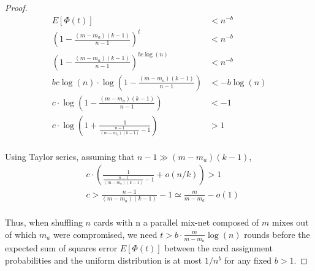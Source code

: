 \documentclass[USenglish,oneside,twocolumn]{article}
\begin{document}
\begin{proof}
\begin{align*}
E[\Phi(t)]&< n^{-b}\\
(1-\frac{(m-m_a)(k-1)}{n-1})^t&< n^{-b}\\
(1-\frac{(m-m_a)(k-1)}{n-1})^{bc\log(n)}&< n^{-b}\\
bc\log(n) \cdot \log(1-\frac{(m-m_a)(k-1)}{n-1}) &< -b \log(n)\\
c\cdot \log(1-\frac{(m-m_a)(k-1)}{n-1}) &< -1\\
c \cdot\log(1+ \frac{1}{\frac{n-1}{(m-m_a)(k-1)}- 1}) &> 1\\
\end{align*}

Using Taylor series, assuming that $n-1\gg(m-m_a)(k-1)$, 
\begin{align*}
&c \cdot (\frac{1}{\frac{n-1}{(m-m_a)(k-1)}- 1} +o(n/k)) > 1 \\
&c> \frac{n-1}{(m-m_a)(k-1)}- 1 \simeq \frac{m}{m-m_a} -o(1)\\
\end{align*}

Thus, when shuffling $n$ cards with n a parallel mix-net composed of $m$ mixes out of which $m_a$ were compromised, we need $t>b\cdot \frac{m}{m-m_a} \log(n) $ rounds before the expected sum of squares error $E[\Phi(t)]$ between the card assignment probabilities and the uniform distribution is at most $1/n^b$ for any fixed $b>1$.
\end{proof}
\end{document}
